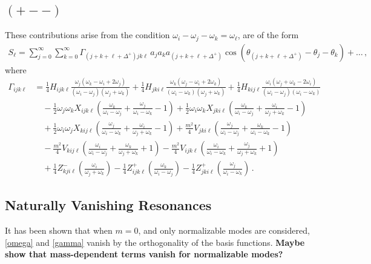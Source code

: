 \documentclass[letterpaper,11pt]{article}
\newcommand{\oi}{\omega_i}
\newcommand{\oj}{\omega_j}
\newcommand{\ok}{\omega_k}
\newcommand{\ol}{\omega_\ell}
\newcommand{\thj}{\theta_j}
\newcommand{\thk}{\theta_k}
\begin{document}

\subsection{$(+--)$}

These contributions arise from the condition $\oi - \oj - \ok = \ol$, are of the form
\begin{align}
S_\ell = \sum_{j=0}^\infty \sum_{k=0}^\infty \Gamma_{(j + k + \ell + \Delta^+) jk\ell} \, a_j a_k a_{(j+k+\ell + \Delta^+)} \cos \left( \theta_{(j+k+\ell + \Delta^+)} - \thj - \thk \right) + \ldots \, ,
\end{align}
where
\begin{align}
\label{gamma}
\Gamma_{ijk\ell} &= \frac{1}{4} H_{ijk\ell} \frac{\oj (\ok - \oi + 2\oj)}{(\oi - \oj)(\oj + \ok)} + \frac{1}{4} H_{jki\ell} \frac{\ok (\oj - \oi + 2\ok)}{(\oi - \ok)(\oj + \ok)} + \frac{1}{4} H_{kij\ell} \frac{\oi (\oj + \ok - 2\oi)}{(\oi - \oj)(\oi - \ok)} \nonumber \\
% 
& \quad -\frac{1}{2} \oj \ok X_{ijk\ell} \left( \frac{\ok}{\oi - \oj} + \frac{\oj}{\oi - \ok} - 1\right) + \frac{1}{2} \oi \ok X_{jki\ell} \left( \frac{\ok}{\oi - \oj} + \frac{\oi}{\oj + \ok} - 1 \right) \nonumber \\
%
& \quad + \frac{1}{2} \oi \oj X_{kij\ell} \left( \frac{\oj}{\oi - \ok} + \frac{\oi}{\oj + \ok} -1 \right) + \frac{m^2}{4} V_{jki\ell} \left( \frac{\oj}{\oi - \oj} + \frac{\ok}{\oi - \ok} -1\right) \nonumber \\
%
& \quad - \frac{m^2}{4} V_{kij\ell} \left( \frac{\oi}{\oi - \oj} + \frac{\ok}{\oj + \ok} + 1\right) - \frac{m^2}{4} V_{ijk\ell} \left( \frac{\oi}{\oi - \ok} + \frac{\oj}{\oj + \ok} + 1 \right) \nonumber \\
%
& \quad + \frac{1}{4} Z^-_{kji\ell} \left( \frac{\oi}{\oj + \ok}\right) - \frac{1}{4} Z^+_{ijk\ell} \left( \frac{\ok}{\oi - \oj} \right) - \frac{1}{4} Z^+_{jki\ell} \left( \frac{\oj}{\oi - \ok}\right) \, .
\end{align}


\subsection{Naturally Vanishing Resonances}

It has been shown that when $m=0$, and only normalizable modes are considered, \eqref{omega} and \eqref{gamma} vanish by the orthogonality of the basis functions. {\bf Maybe show that mass-dependent terms vanish for normalizable modes?}
\end{document}
